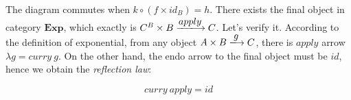 \documentclass[b5paper]{article}
\begin{document}
The diagram commutes when $k \circ (f \times id_B) = h$. There exists the final object in category $\pmb{Exp}$, which exactly is $C^B \times B \arrowto{apply} C$. Let's verify it. According to the definition of exponential, from any object $A \times B \arrowto{g} C$, there is $apply$ arrow $\lambda g = curry\ g$. On the other hand, the endo arrow to the final object must be $id$, hence we obtain the {\em reflection law}:

\[
curry\ apply = id
\]

\begin{Exercise}\label{ex:exp-obj}
\end{Exercise}
\end{document}
